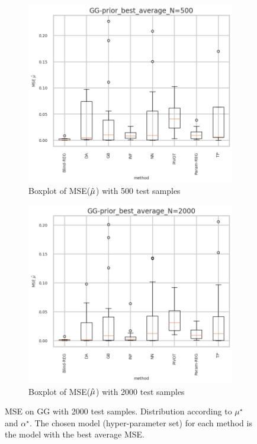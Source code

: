 \begin{figure}[ht!]
  \begin{subfigure}[t]{0.49\linewidth}
    \includegraphics[width=\linewidth]{COMPARE/GG-prior/BEST_MSE/GG-prior_best_average_N=500-boxplot_mse.png}
    \caption{Boxplot of MSE($\hat\mu$) with 500 test samples}
  \end{subfigure}%
  \hfill
  \begin{subfigure}[t]{0.49\linewidth}
    \includegraphics[width=\linewidth]{COMPARE/GG-prior/BEST_MSE/GG-prior_best_average_N=2000-boxplot_mse.png}
    \caption{Boxplot of MSE($\hat\mu$) with 2000 test samples}
  \end{subfigure}

  \caption{MSE on GG with 2000 test samples. Distribution according to $\mu^\star$ and $\alpha^\star$. The chosen model (hyper-parameter set) for each method is the model with the best average MSE.}
  \label{fig:compare_gg_best_mse_n_samples}
\end{figure}





